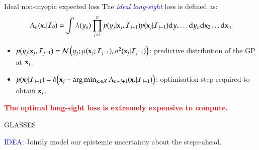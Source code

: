 \documentclass[15pt,serif,mathserif,final]{beamer}
\newcommand{\I}{\mathcal{I}}
\newcommand{\ud}{\mathrm{d}}
\newcommand{\xst}{x_{\ast}}
\newcommand{\yst}{y_{\ast}}
\begin{document}
\begin{frame}{}
\begin{columns}[t]
\begin{column}{0.32\linewidth}
\begin{block}{Ideal non-myopic expected loss}
The \textcolor{blue}{\emph{ideal long-sight}} loss is defined as:
$$\Lambda_n(\latentVector_*|\I_0 ) =  \int \lambda(y_n) \prod_{j=1}^{n}p(y_{j}|\latentVector_{j},\I_{j-1}) p(\latentVector_{j}|\I_{j-1}) \ud y_*\dots \ud y_n \ud\latentVector_2\dots \ud\latentVector_n$$
\begin{itemize}
\item $p(y_{j}|\latentVector_{j},\I_{j-1})= \mathcal{N} \left(y_{j};\mu(\latentVector_{j};\I_{j-1}),\sigma^2(\latentVector_{j}|\I_{j-1} ) \right)$: predictive distribution of the GP at $\mathbf{x}_{j}$.
\item $p(\latentVector_{j}|\I_{j-1}) = \delta \bigr(\latentVector_{j} - \arg \min_{\latentVector_* \in {\mathcal X}} \Lambda_{n-j+1}(\latentVector_*|\I_{j-1})\bigl)$: optimisation step required to obtain $\mathbf{x}_{j}$.
\end{itemize}

 \begin{center}
 \textcolor{red}{\textbf{The optimal long-sight loss is extremely expensive to compute.}}
 \end{center}

\end{block}


\begin{block}{GLASSES}

\textcolor{blue}{IDEA}: Jointly model our epistemic uncertainty about the steps-ahead.
\begin{figure}[t!]

\centering
{}
\end{figure}
\end{block}
\end{column}
\end{columns}
\end{frame}
\end{document}

